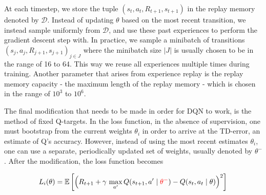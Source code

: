 \documentclass[12pt,letterpaper]{article}
\begin{document}
At each timestep, we store the tuple $(s_t, a_t, R_{t+1}, s_{t+1})$ in the replay memory denoted by 
$\mathcal{D}$. Instead of updating $\theta$ based on the most recent transition, we instead sample 
uniformly from $\mathcal{D}$, and use these past experiences to perform the gradient descent step with. 
In practice, we sample a minibatch of transitions $(s_j, a_j, R_{j+1}, s_{j+1})_{j \in J}$ where the 
minibatch size $|J|$ is usually chosen to be in the range of 16 to 64. This way we reuse all experiences
 multiple times during training. Another parameter that arises from experience replay is the replay 
 memory capacity - the maximum length of the replay memory - which is chosen in the range of $10^3$ to $10^6$.   

The final modification that needs to be made in order for DQN to work, is the method of fixed Q-targets. 
In the loss function, in the absence of supervision, one must bootstrap from the current weights $\theta_i$ 
in order to arrive at the TD-error, an estimate of Q's accuracy. However, instead of using the most recent 
estimates $\theta_i$, one can use a separate, periodically updated set of weights, usually denoted by $\theta^-$. 
After the modification, the loss function becomes 

\begin{align}
L_i(\theta) = \mathbb{E} \left[ \left( R_{t+1} + \gamma\, \max\limits_{a'} Q(s_{t+1}, a' \mid {\color{red} \theta^-}) - Q(s_t, a_t \mid \theta) \right)^2 \right]
\end{align}
\end{document}
